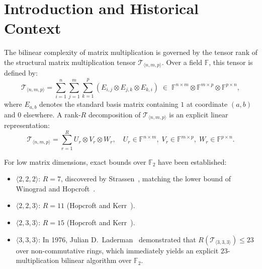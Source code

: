 \documentclass[11pt,reqno]{amsart}
\theoremstyle{plain}
\theoremstyle{definition}
\begin{document}
\maketitle

\section{Introduction and Historical Context}

The bilinear complexity of matrix multiplication is governed by the tensor rank of the structural matrix multiplication tensor $\mathcal{T}_{\langle n, m, p \rangle}$. Over a field $\mathbb{F}$, this tensor is defined by:
\begin{equation}
\mathcal{T}_{\langle n, m, p \rangle} = \sum_{i=1}^n \sum_{j=1}^m \sum_{k=1}^p (E_{i,j} \otimes E_{j,k} \otimes E_{k,i}) \;\in\; \mathbb{F}^{n \times m} \otimes \mathbb{F}^{m \times p} \otimes \mathbb{F}^{p \times n},
\end{equation}
where $E_{a,b}$ denotes the standard basis matrix containing $1$ at coordinate $(a, b)$ and $0$ elsewhere. A rank-$R$ decomposition of $\mathcal{T}_{\langle n, m, p \rangle}$ is an explicit linear representation:
\begin{equation}
\mathcal{T}_{\langle n, m, p \rangle} = \sum_{r=1}^R U_r \otimes V_r \otimes W_r, \quad U_r \in \mathbb{F}^{n \times m}, \; V_r \in \mathbb{F}^{m \times p}, \; W_r \in \mathbb{F}^{p \times n}.
\end{equation}

For low matrix dimensions, exact bounds over $\mathbb{F}_2$ have been established:
\begin{itemize}
    \item $\langle 2, 2, 2 \rangle$: $R = 7$, discovered by Strassen~\cite{strassen1969}, matching the lower bound of Winograd and Hopcroft~\cite{winograd1971, hopcroft1971}.
    \item $\langle 2, 2, 3 \rangle$: $R = 11$ (Hopcroft and Kerr~\cite{hopcroft1971}).
    \item $\langle 2, 3, 3 \rangle$: $R = 15$ (Hopcroft and Kerr~\cite{hopcroft1971}).
    \item $\langle 3, 3, 3 \rangle$: In 1976, Julian D.~Laderman~\cite{laderman1976} demonstrated that $R(\mathcal{T}_{\langle 3, 3, 3 \rangle}) \le 23$ over non-commutative rings, which immediately yields an explicit $23$-multiplication bilinear algorithm over $\mathbb{F}_2$.
\end{itemize}
\end{document}
